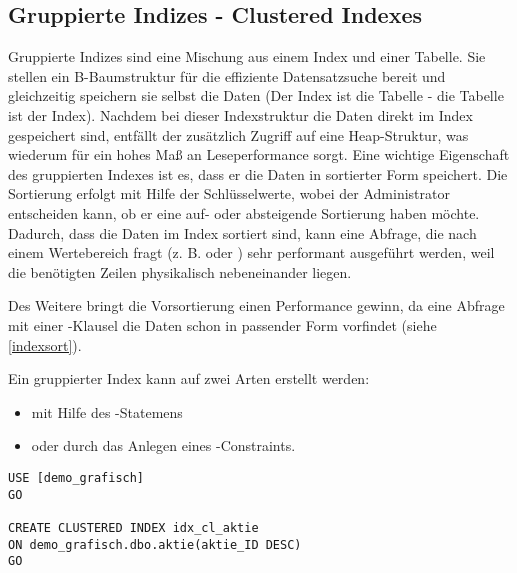       \subsection{Gruppierte Indizes - Clustered Indexes}
        Gruppierte Indizes sind eine Mischung aus einem Index und einer Tabelle.
        Sie stellen ein B-Baumstruktur für die effiziente Datensatzsuche bereit
        und gleichzeitig speichern sie selbst die Daten (Der Index ist die
        Tabelle - die Tabelle ist der Index). Nachdem bei dieser Indexstruktur
        die Daten direkt im Index gespeichert sind, entfällt der zusätzlich
        Zugriff auf eine Heap-Struktur, was wiederum für ein hohes Maß an
        Leseperformance sorgt.
        Eine wichtige Eigenschaft des gruppierten Indexes ist es, dass er die
        Daten in sortierter Form speichert. Die Sortierung erfolgt mit Hilfe der
        Schlüsselwerte, wobei der Administrator entscheiden kann, ob er eine
        auf- oder absteigende Sortierung haben möchte. Dadurch, dass die
        Daten im Index sortiert sind, kann eine Abfrage, die nach einem
        Wertebereich fragt (z. B.  oder ) sehr
        performant ausgeführt werden, weil die benötigten Zeilen physikalisch
        nebeneinander liegen.
        
        Des Weitere bringt die Vorsortierung einen Performance gewinn, da eine
        Abfrage mit einer \ORDERBY-Klausel die Daten schon in passender Form
        vorfindet (siehe \ref{indexsort}).
        
        Ein gruppierter Index kann auf zwei Arten erstellt werden:
        \begin{itemize}
          \item mit Hilfe des -Statemens
          \item oder durch das Anlegen eines \PRIMARYKEY-Constraints.
        \end{itemize}
        \begin{lstlisting}[language=ms_sql, caption={Erstellen eines
        gruppierten Indizes}, label=admin05_07]
USE [demo_grafisch]
GO

CREATE CLUSTERED INDEX idx_cl_aktie
ON demo_grafisch.dbo.aktie(aktie_ID DESC)
GO
        \end{lstlisting}
        \begin{literaturinternet}
          \item \cite{ms186342}
        \end{literaturinternet}
